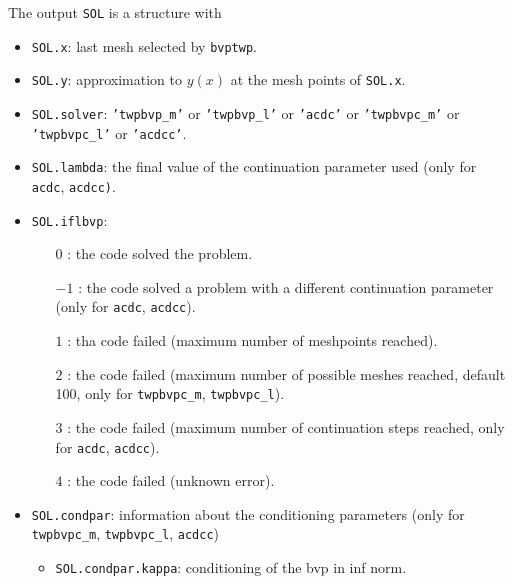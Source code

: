 \documentclass{article}
\begin{document}
The output \texttt{SOL} is a structure with
\begin{itemize}
         \item \texttt{SOL.x}:  last mesh selected by   \texttt{bvptwp}.
         \item  \texttt{SOL.y}: approximation to $y(x)$ at the mesh points of
         \texttt{SOL.x}.
         \item \texttt{SOL.solver}: \texttt{'twpbvp\_m'} or \texttt{'twpbvp\_l'}
         or \texttt{'acdc'} or \texttt{'twpbvpc\_m'} or \texttt{'twpbvpc\_l'} or
         \texttt{'acdcc'}.
         \item \texttt{SOL.lambda}: the final value of the continuation 
                            parameter used (only for \texttt{acdc},
                            \texttt{acdcc)}.
         \item  \texttt{SOL.iflbvp}:  
         \begin{itemize} 
                     \item[$0$]: the code solved the problem.
                   
                     \item[$-1$]: the code solved a problem with a different
                            continuation parameter  (only for \texttt{acdc},
                            \texttt{acdcc}).
 
                    \item[$1$]: tha code failed (maximum number of meshpoints
                          reached).
                          
                     \item[$2$]: the code failed (maximum number of possible
                           meshes reached, default 100, only for
                           \texttt{twpbvpc\_m}, \texttt{twpbvpc\_l}).
                           
                     \item[$3$]: the code failed (maximum number of continuation
                          steps reached, only for  \texttt{acdc},
                          \texttt{acdcc}). 
                     \item[$4$]: the code failed (unknown error).
                     \end{itemize}
                          
         \item \texttt{SOL.condpar}: information about the conditioning
         parameters (only for \texttt{twpbvpc\_m}, \texttt{twpbvpc\_l},
         \texttt{acdcc})
                        \begin{itemize}
                         \item \texttt{SOL.condpar.kappa}: conditioning of the
                         bvp in inf norm.
                         

\end{itemize}
\end{itemize}
\end{document}
